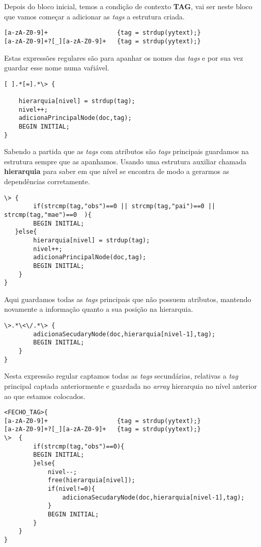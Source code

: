 \documentclass{report}
\begin{document}
    Depois do bloco inicial, temos a condição de contexto \textbf{TAG}, vai ser neste bloco que vamos começar a adicionar as \textit{tags} a estrutura criada.

\begin{verbatim}
[a-zA-Z0-9]+                   {tag = strdup(yytext);}
[a-zA-Z0-9]+?[_][a-zA-Z0-9]+   {tag = strdup(yytext);}
\end{verbatim}

    Estas expressões regulares são para apanhar os nomes das \textit{tags} e por sua vez guardar esse nome numa vaŕiável.


\begin{verbatim}
[ ].*[=].*\> {   
                                                   
    hierarquia[nivel] = strdup(tag);
    nivel++;
    adicionaPrincipalNode(doc,tag);
    BEGIN INITIAL;
}
\end{verbatim}

    Sabendo a partida que as \textit{tags} com atributos são \textit{tags} principais guardamos na estrutura sempre que as apanhamos. Usando uma estrutura auxiliar chamada \textbf{hierarquia} para saber em que nível se encontra de modo a gerarmos as dependências corretamente.

\begin{verbatim}
\> {
        if(strcmp(tag,"obs")==0 || strcmp(tag,"pai")==0 || strcmp(tag,"mae")==0  ){
        BEGIN INITIAL;
   }else{
        hierarquia[nivel] = strdup(tag);
        nivel++;
        adicionaPrincipalNode(doc,tag);
        BEGIN INITIAL;
    }
}
\end{verbatim}

    Aqui guardamos todas as \textit{tags} principais que não possuem atributos, mantendo novamente a informação quanto a sua posição na hierarquia.

\begin{verbatim}
\>.*\<\/.*\> {
        adicionaSecudaryNode(doc,hierarquia[nivel-1],tag);
        BEGIN INITIAL;
    }
}
\end{verbatim}
    
    Nesta expressão regular captamos todas as \textit{tags} secundárias, relativas a \textit{tag} principal captada anteriormente e guardada no \textit{array} hierarquia no nível anterior ao que estamos colocados.



\begin{verbatim}
<FECHO_TAG>{
[a-zA-Z0-9]+                   {tag = strdup(yytext);}
[a-zA-Z0-9]+?[_][a-zA-Z0-9]+   {tag = strdup(yytext);} 
\>  {
        if(strcmp(tag,"obs")==0){
        BEGIN INITIAL;
        }else{
            nivel--;
            free(hierarquia[nivel]);
            if(nivel!=0){
                adicionaSecudaryNode(doc,hierarquia[nivel-1],tag);
            }
            BEGIN INITIAL;
        }
    }
}
\end{verbatim}
\end{document}
